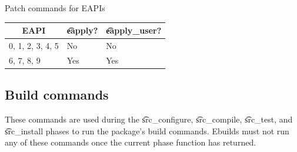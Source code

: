 \begin{centertable}{Patch commands for EAPIs}
    \label{tab:patch-commands}
    \begin{tabular}{lll}
      \toprule
      \multicolumn{1}{c}{\textbf{EAPI}} &
      \multicolumn{1}{c}{\textbf{\t{eapply}?}} &
      \multicolumn{1}{c}{\textbf{\t{eapply_user}?}} \\
      \midrule
      0, 1, 2, 3, 4, 5  & No  & No  \\
      6, 7, 8, 9        & Yes & Yes \\
      \bottomrule
    \end{tabular}
\end{centertable}

\subsection{Build commands}
\label{sec:build-commands}
These commands are used during the \t{src_configure}, \t{src_compile}, \t{src_test},
and \t{src_install} phases to run the package's build commands. Ebuilds must not run any of these
commands once the current phase function has returned.

